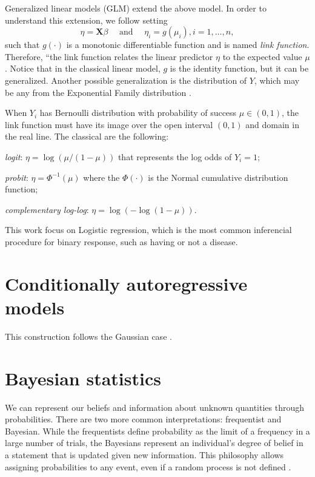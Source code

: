 Generalized linear models (GLM) extend the above model. In order to understand
this extension, we follow \textcite[p. 27]{mccullagh2019generalized} setting 
\begin{equation*}
  \eta = \boldsymbol{X}\beta \quad \text{ and } \quad \eta_i = g(\mu_i), i = 1, \dots, n,
\end{equation*}
such that $g(\cdot)$ is a monotonic differentiable function and is named {\em
link function}. Therefore, ``the link function relates the linear predictor
$\eta$ to the expected value $\mu$ \cite[p. 31]{mccullagh2019generalized}.
Notice that in the classical linear model, $g$ is the identity function, but
it can be generalized. Another possible generalization is the distribution of
$Y$, which may be any from the Exponential Family distribution \cite[p.
115]{Robert2007}. 

When $Y_i$ has Bernoulli distribution with probability of success $\mu \in
(0,1)$, the link function must have its image over the open interval $(0,1)$
and domain in the real line. The classical are the following:  

\begin{alineas}
  \item \textit{logit}: $\eta = \log(\mu / (1 - \mu))$ that represents 
  the log odds of $Y_i = 1$;
  \item \textit{probit}: $\eta = \Phi^{-1}(\mu)$ where the $\Phi(\cdot)$ 
  is the Normal cumulative distribution function; 
  \item \textit{complementary log-log}: $\eta = \log(-\log(1 - \mu))$.
\end{alineas}

This work focus on Logistic regression, which is the most common inferencial
procedure for binary response, such as having or not a disease. 

\section{Conditionally autoregressive models}
\label{sec:car-models}

This construction follows the Gaussian case \cite[Section
3.3.1]{banerjee2003hierarchical}. 


\section{Bayesian statistics}
\label{sec:bayesian_statistics}

We can represent our beliefs and information about unknown quantities 
through probabilities. There are two more common interpretations: 
frequentist and Bayesian. While the frequentists define
probability as the limit of a frequency in a large number of trials, the
Bayesians represent an individual's degree of belief in a statement that is
updated given new information. This philosophy allows assigning probabilities
to any event, even if a random process is not defined \cite{statisticat2016laplacesdemon}. 

